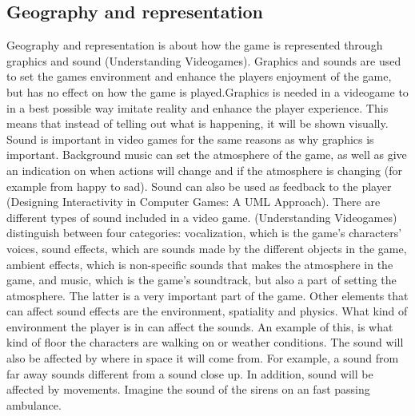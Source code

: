 \subsection{Geography and representation}
Geography and representation is about how the game is represented through graphics and sound (Understanding Videogames). Graphics and sounds are used to set the games environment and enhance the players enjoyment of the game, but has no effect on how the game is played.Graphics is needed in a videogame to in a best possible way imitate reality and enhance the player experience. This means that instead of telling out what is happening, it will be shown visually. Sound is important in video games for the same reasons as why graphics is important. Background music can set the atmosphere of the game, as well as give an indication on when actions will change and if the atmosphere is changing (for example from happy to sad). Sound can also be used as feedback to the player (Designing Interactivity in Computer Games: A UML Approach). There are different types of sound included in a  video game. (Understanding Videogames) distinguish between four categories:
vocalization, which is the game’s characters’ voices,
sound effects, which are sounds made by the different objects in the game,
ambient effects, which is non-specific sounds that makes the atmosphere in the game, and
music, which is the game’s soundtrack, but also a part of setting the atmosphere. The latter is a very important part of the game. Other elements that can affect sound effects are the environment, spatiality and physics. What kind of environment the player is in can affect the  sounds. An example of this, is what kind of floor the characters are walking on or weather conditions. The sound will also be affected by where in space it will come from. For example, a sound from far away sounds different from a sound close up. In addition, sound will be affected by movements. Imagine the sound of the sirens on an fast passing ambulance.

